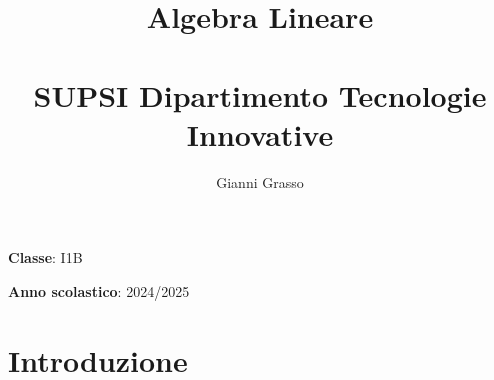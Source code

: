 \documentclass{article}
\title{
    Algebra Lineare \\
    \phantom{}\\
    \large SUPSI Dipartimento Tecnologie Innovative
}
\author{Gianni Grasso}
\begin{document}
\maketitle
\hphantom{ }
\vspace{14.5cm}

\textbf{Classe}: I1B

\textbf{Anno scolastico}: 2024/2025
\pagebreak


\tableofcontents
\pagebreak

\section{Introduzione}

\pagebreak
\end{document}
